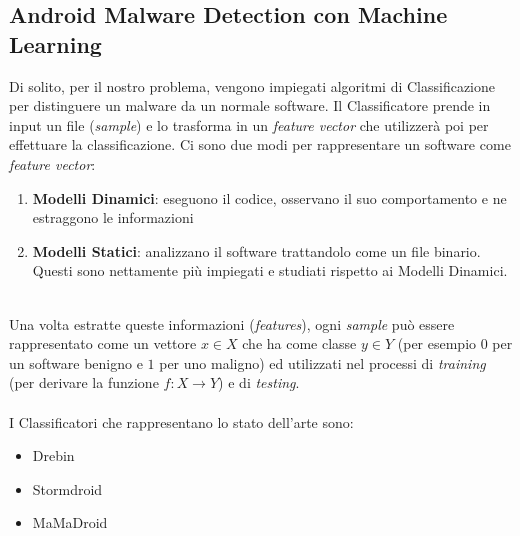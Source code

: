 \subsection{Android Malware Detection con Machine Learning}
Di solito, per il nostro problema, vengono impiegati algoritmi di Classificazione \cite{8672711} per distinguere un malware da un normale software. Il Classificatore prende in input un file (\textit{sample}) e lo trasforma in un \textit{feature vector} che utilizzerà poi per effettuare la classificazione. Ci sono due modi per rappresentare un software come \textit{feature vector}:

\begin{enumerate}
    \item \textbf{Modelli Dinamici}: eseguono il codice, osservano il suo comportamento e ne estraggono le informazioni
    \item \textbf{Modelli Statici}: analizzano il software trattandolo come un file binario. Questi sono nettamente più impiegati e studiati rispetto ai Modelli Dinamici.
\end{enumerate}
\ \\
Una volta estratte queste informazioni (\textit{features}), ogni \textit{sample} può essere rappresentato come un vettore \(x \in X\) che ha come classe \(y \in Y\) (per esempio \(0\) per un software benigno e \(1\) per uno maligno) ed utilizzati nel processi di \textit{training} (per derivare la funzione \(f : X \to Y\)) e di \textit{testing}.\\
\\
I Classificatori che rappresentano lo stato dell'arte sono:

\begin{itemize}
    \item Drebin
    \item Stormdroid
    \item MaMaDroid
\end{itemize}

